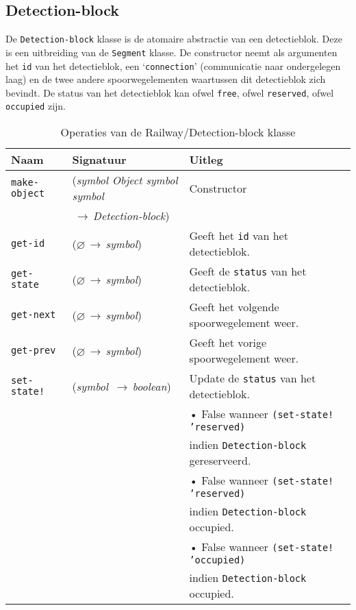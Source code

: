 \documentclass[a4paper, 11pt]{article}
\newcommand{\naar}{\,$\rightarrow$\,}
\renewcommand{\empty}{$\varnothing$}
\newcommand{\<}{\scriptsize\textless\normalsize}
\renewcommand{\>}{\scriptsize\textgreater\normalsize}
\begin{document}
\subsection{Detection-block} %
De \texttt{Detection-block} klasse is de atomaire abstractie van een detectieblok. Deze is een uitbreiding van de \texttt{Segment} klasse. De constructor neemt als argumenten het \texttt{id} van het detectieblok, een \lq\texttt{connection}' (communicatie naar ondergelegen laag) en de twee andere spoorwegelementen waartussen dit detectieblok zich bevindt. De status van het detectieblok kan ofwel \texttt{free}, ofwel \texttt{reserved}, ofwel \texttt{occupied} zijn.
\begin{table}[H]
	\begin{center}
		{
		\begin{tabular}{|l l l|}
			\hline
			\textbf{Naam} & \textbf{Signatuur} & \textbf{Uitleg}\\
			\hline
			\texttt{make-object} & (\textit{symbol Object symbol symbol} & Constructor\\
			&\naar \textit{Detection-block})&\\
			\hline
			\texttt{get-id} & (\empty \naar \textit{symbol}) & Geeft het \texttt{id} van het detectieblok.\\
			\texttt{get-state} & (\empty \naar \textit{symbol}) & Geeft de \texttt{status} van het detectieblok.\\
			\texttt{get-next} & (\empty \naar \textit{symbol}) & Geeft het volgende spoorwegelement weer.\\
			\texttt{get-prev} & (\empty \naar \textit{symbol}) & Geeft het vorige spoorwegelement weer.\\
			\texttt{set-state!} & (\textit{symbol} \naar \textit{boolean}) & Update de \texttt{status} van het detectieblok.\\
			&& • False wanneer \texttt{(set-state! 'reserved)}\\
			&&   indien \texttt{Detection-block} gereserveerd.\\
			&& • False wanneer \texttt{(set-state! 'reserved)}\\
			&&   indien \texttt{Detection-block} occupied.\\
			&& • False wanneer \texttt{(set-state! 'occupied)}\\
			&&   indien \texttt{Detection-block} occupied.\\
			\hline
		\end{tabular}}
		\caption{Operaties van de Railway/Detection-block klasse}
	\end{center}
\end{table}
\end{document}
